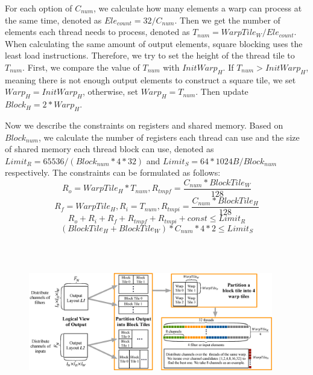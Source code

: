 For each option of $C_{num}$, we calculate how many elements a warp can process at the same time, denoted as $Ele_{count}=32/C_{num}$. 
Then we get the number of elements each thread needs to process, denoted as $T_{num}=WarpTile_W/Ele_{count}$.
When calculating the same amount of output elements, square blocking uses the least load instructions. 
Therefore, we try to set the height of the thread tile to $T_{num}$.
First, we compare the value of $T_{num}$ with $InitWarp_H$.
If $T_{num}>InitWarp_H$, meaning there is not enough output elements to construct a square tile, we set $Warp_H=InitWarp_H$, otherwise, set $Warp_H=T_{num}$.
Then update $Block_H=2*Warp_H$.

Now we describe the constraints on registers and shared memory. Based on $Block_{num}$, we calculate the number of registers each thread can use and the size of shared memory each thread block can use, denoted as $Limit_R=65536/(Block_{num}*4*32)$ and $Limit_S=64*1024B/Block_{num}$ respectively.
The constraints can be formulated as follows:
\begin{equation}\nonumber
R_{o}=WarpTile_H*T_{num},R_{tmpf}=\frac{C_{num}*BlockTile_W}{128}
\end{equation}
\begin{equation}\nonumber
R_{f}=WarpTile_H,R_{i}=T_{num},R_{tmpi}=\frac{C_{num}*BlockTile_H}{128}
\end{equation}
\begin{equation}
R_{o}+R_{i}+R_{f}+R_{tmpf}+R_{tmpi}+const \leq Limit_R
\end{equation}
\begin{equation}
(BlockTile_H+BlockTile_W)*C_{num}*4*2 \leq Limit_S
\end{equation}
\begin{figure}
	\centering
    \includegraphics[width=0.95\textwidth,height=7cm]{./figure/pwworkflow1.eps}
    \caption{} \label{fig:pwworkflow}
\end{figure}
